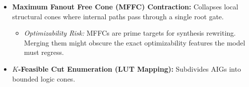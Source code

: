 \documentclass[paper=a4, fontsize=11pt]{scrartcl} %
\numberwithin{equation}{section} %
\numberwithin{figure}{section} %
\numberwithin{table}{section} %
\begin{document}
\begin{itemize}
    \item \textbf{Maximum Fanout Free Cone (MFFC) Contraction:} Collapses local structural cones where internal paths pass through a single root gate.
    \begin{itemize}
        \item \textit{Optimizability Risk:} MFFCs are prime targets for synthesis rewriting. Merging them might obscure the exact optimizability features the model must regress.
    \end{itemize}
    \item \textbf{$K$-Feasible Cut Enumeration (LUT Mapping):} Subdivides AIGs into bounded logic cones.
\end{itemize}






\end{document}
